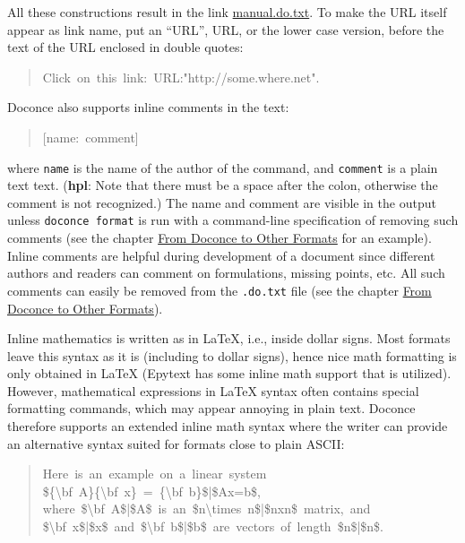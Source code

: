 \documentclass[a4paper,english]{article}
\begin{document}
All these constructions result in the link \url{manual.do.txt}.
To make the URL itself appear as link name, put an ``URL'', URL, or
the lower case version, before the text of the URL enclosed in double
quotes:
%
\begin{quote}{\ttfamily \raggedright \noindent
Click~on~this~link:~URL:"http://some.where.net".
}
\end{quote}

Doconce also supports inline comments in the text:
%
\begin{quote}{\ttfamily \raggedright \noindent
{[}name:~comment{]}
}
\end{quote}

where \texttt{name} is the name of the author of the command, and \texttt{comment} is a
plain text text. (\textbf{hpl}: Note that there must be a space after the colon,
otherwise the comment is not recognized.)
The name and comment are visible in the output unless \texttt{doconce format}
is run with a command-line specification of removing such comments
(see the chapter \hyperref[from-doconce-to-other-formats]{From Doconce to Other Formats} for an example). Inline comments
are helpful during development of a document since different authors
and readers can comment on formulations, missing points, etc.
All such comments can easily be removed from the \texttt{.do.txt} file
(see the chapter \hyperref[from-doconce-to-other-formats]{From Doconce to Other Formats}).

Inline mathematics is written as in LaTeX, i.e., inside dollar signs.
Most formats leave this syntax as it is (including to dollar signs),
hence nice math formatting is only obtained in LaTeX (Epytext has some
inline math support that is utilized).  However, mathematical
expressions in LaTeX syntax often contains special formatting
commands, which may appear annoying in plain text. Doconce therefore
supports an extended inline math syntax where the writer can provide
an alternative syntax suited for formats close to plain ASCII:
%
\begin{quote}{\ttfamily \raggedright \noindent
Here~is~an~example~on~a~linear~system\\
\$\{\textbackslash{}bf~A\}\{\textbackslash{}bf~x\}~=~\{\textbackslash{}bf~b\}\$|\$Ax=b\$,\\
where~\$\textbackslash{}bf~A\$|\$A\$~is~an~\$n\textbackslash{}times~n\$|\$nxn\$~matrix,~and\\
\$\textbackslash{}bf~x\$|\$x\$~and~\$\textbackslash{}bf~b\$|\$b\$~are~vectors~of~length~\$n\$|\$n\$.
}
\end{quote}
\end{document}
